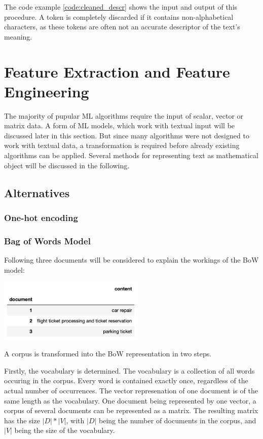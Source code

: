 	 The code example \ref{code:cleaned_descr} shows the input and output of this procedure. A token is completely discarded if it contains non-alphabetical characters, as these tokens are often not an accurate descriptor of the text's meaning.	

        
        \section{Feature Extraction and Feature Engineering}
        The majority of pupular ML algorithms require the input of scalar, vector or matrix data. A form of ML models, which work with textual input will be discussed later in this section. 
        But since many algorithms were not designed to work with textual data, a transformation is required before already existing algorithms can be applied. Several methods for representing text as mathematical object will be discussed in the following.
    
            \subsection{Alternatives}
            \subsubsection{One-hot encoding}
            
    
            \subsubsection{Bag of Words Model}
            Following three documents will be considered to explain the workings of the \ac{BoW} model:
    
            \includegraphics[height=3cm]{Bilder/corpus_bow.png}
            
            A corpus is transformed into the \ac{BoW} representation in two steps. 
            
            Firstly, the vocabulary is determined. 
            The vocabulary is a collection of all words occuring in the corpus. Every word is contained exactly once, regardless of the actual number of occurrences. The vector represenation of one document is of the same length as the vocabulary. One document being represented by one vector, a corpus of several documents can be represented as a matrix. The resulting matrix has the size $ |D|*|V| $, with $|D|$ being the number of documents in the corpus, and $|V|$ being the size of the vocabulary.
            
